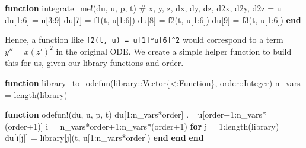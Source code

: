 \documentclass[
]{article}
\newenvironment{Shaded}{\begin{snugshade}}{\end{snugshade}}
\newcommand{\CommentTok}[1]{\textcolor[rgb]{0.37,0.37,0.37}{#1}}
\newcommand{\ControlFlowTok}[1]{\textcolor[rgb]{0.00,0.23,0.31}{\textbf{#1}}}
\newcommand{\DataTypeTok}[1]{\textcolor[rgb]{0.68,0.00,0.00}{#1}}
\newcommand{\FloatTok}[1]{\textcolor[rgb]{0.68,0.00,0.00}{#1}}
\newcommand{\FunctionTok}[1]{\textcolor[rgb]{0.28,0.35,0.67}{#1}}
\newcommand{\KeywordTok}[1]{\textcolor[rgb]{0.00,0.23,0.31}{\textbf{#1}}}
\newcommand{\NormalTok}[1]{\textcolor[rgb]{0.00,0.23,0.31}{#1}}
\newcommand{\OperatorTok}[1]{\textcolor[rgb]{0.37,0.37,0.37}{#1}}
\begin{document}
\begin{Shaded}
\begin{Highlighting}[]
\KeywordTok{function} \FunctionTok{integrate\_me!}\NormalTok{(du, u, p, t)}
  \CommentTok{\# x, y, z, dx, dy, dz, d2x, d2y, d2z = u}
\NormalTok{  du[}\FloatTok{1}\OperatorTok{:}\FloatTok{6}\NormalTok{] }\OperatorTok{=}\NormalTok{ u[}\FloatTok{3}\OperatorTok{:}\FloatTok{9}\NormalTok{]}
\NormalTok{  du[}\FloatTok{7}\NormalTok{] }\OperatorTok{=} \FunctionTok{f1}\NormalTok{(t, u[}\FloatTok{1}\OperatorTok{:}\FloatTok{6}\NormalTok{])}
\NormalTok{  du[}\FloatTok{8}\NormalTok{] }\OperatorTok{=} \FunctionTok{f2}\NormalTok{(t, u[}\FloatTok{1}\OperatorTok{:}\FloatTok{6}\NormalTok{])}
\NormalTok{  du[}\FloatTok{9}\NormalTok{] }\OperatorTok{=} \FunctionTok{f3}\NormalTok{(t, u[}\FloatTok{1}\OperatorTok{:}\FloatTok{6}\NormalTok{])}
\KeywordTok{end}
\end{Highlighting}
\end{Shaded}

Hence, a function like \texttt{f2(t,\ u)\ =\ u{[}1{]}*u{[}6{]}\^{}2}
would correspond to a term \(y'' = x (z')^2\) in the original ODE. We
create a simple helper function to build this for us, given our library
functions and order.

\begin{tcolorbox}[enhanced jigsaw, colback=white, bottomtitle=1mm, coltitle=black, arc=.35mm, toprule=.15mm, opacitybacktitle=0.6, leftrule=.75mm, titlerule=0mm, breakable, colbacktitle=quarto-callout-tip-color!10!white, rightrule=.15mm, colframe=quarto-callout-tip-color-frame, bottomrule=.15mm, toptitle=1mm, title={Generate a function applying library functions to an integrand (Julia
implementation)}, left=2mm, opacityback=0]

\begin{Shaded}
\begin{Highlighting}[]
\KeywordTok{function} \FunctionTok{library\_to\_odefun}\NormalTok{(library}\OperatorTok{::}\DataTypeTok{Vector\{\textless{}:Function\}}\NormalTok{, order}\OperatorTok{::}\DataTypeTok{Integer}\NormalTok{)}
\NormalTok{  n\_vars }\OperatorTok{=} \FunctionTok{length}\NormalTok{(library)}

  \KeywordTok{function} \FunctionTok{odefun!}\NormalTok{(du, u, p, t)}
\NormalTok{    du[}\FloatTok{1}\OperatorTok{:}\NormalTok{n\_vars}\OperatorTok{*}\NormalTok{order] }\OperatorTok{.=}\NormalTok{ u[order}\OperatorTok{+}\FloatTok{1}\OperatorTok{:}\FunctionTok{n\_vars*}\NormalTok{(order}\OperatorTok{+}\FloatTok{1}\NormalTok{)] }
\NormalTok{    i }\OperatorTok{=}\NormalTok{ n\_vars}\OperatorTok{*}\NormalTok{order}\OperatorTok{+}\FloatTok{1}\OperatorTok{:}\FunctionTok{n\_vars*}\NormalTok{(order}\OperatorTok{+}\FloatTok{1}\NormalTok{)}
    \ControlFlowTok{for}\NormalTok{ j }\OperatorTok{=} \FloatTok{1}\OperatorTok{:}\FunctionTok{length}\NormalTok{(library)}
\NormalTok{      du[i[j]] }\OperatorTok{=}\NormalTok{ library[j](t, u[}\FloatTok{1}\OperatorTok{:}\NormalTok{n\_vars}\OperatorTok{*}\NormalTok{order])}
    \ControlFlowTok{end}
  \KeywordTok{end}
\KeywordTok{end}
\end{Highlighting}
\end{Shaded}

\end{tcolorbox}
\end{document}
